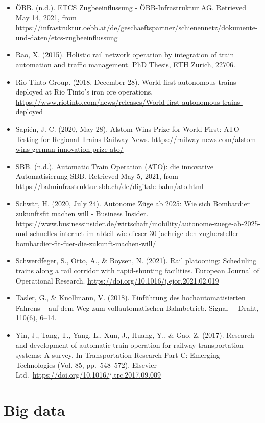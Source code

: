 \documentclass[
]{book}
\begin{document}
\begin{itemize}
\item
  ÖBB. (n.d.). ETCS Zugbeeinflussung - ÖBB-Infrastruktur AG. Retrieved May 14, 2021, from \url{https://infrastruktur.oebb.at/de/geschaeftspartner/schienennetz/dokumente-und-daten/etcs-zugbeeinflussung}
\item
  Rao, X. (2015). Holistic rail network operation by integration of train automation and traffic management. PhD Thesis, ETH Zurich, 22706.
\item
  Rio Tinto Group. (2018, December 28). World-first autonomous trains deployed at Rio Tinto's iron ore operations. \url{https://www.riotinto.com/news/releases/World-first-autonomous-trains-deployed}
\item
  Sapién, J. C. (2020, May 28). Alstom Wins Prize for World-First: ATO Testing for Regional Trains \textbar{} Railway-News. \url{https://railway-news.com/alstom-wins-german-innovation-prize-ato/}
\item
  SBB. (n.d.). Automatic Train Operation (ATO): die innovative Automatisierung \textbar{} SBB. Retrieved May 5, 2021, from \url{https://bahninfrastruktur.sbb.ch/de/digitale-bahn/ato.html}
\item
  Schwär, H. (2020, July 24). Autonome Züge ab 2025: Wie sich Bombardier zukunftsfit machen will - Business Insider. \url{https://www.businessinsider.de/wirtschaft/mobility/autonome-zuege-ab-2025-und-schnelles-internet-im-abteil-wie-dieser-30-jaehrige-den-zughersteller-bombardier-fit-fuer-die-zukunft-machen-will/}
\item
  Schwerdfeger, S., Otto, A., \& Boysen, N. (2021). Rail platooning: Scheduling trains along a rail corridor with rapid-shunting facilities. European Journal of Operational Research. \url{https://doi.org/10.1016/j.ejor.2021.02.019}
\item
  Tasler, G., \& Knollmann, V. (2018). Einführung des hochautomatisierten Fahrens -- auf dem Weg zum vollautomatischen Bahnbetrieb. Signal + Draht, 110(6), 6--14.
\item
  Yin, J., Tang, T., Yang, L., Xun, J., Huang, Y., \& Gao, Z. (2017). Research and development of automatic train operation for railway transportation systems: A survey. In Transportation Research Part C: Emerging Technologies (Vol. 85, pp.~548--572). Elsevier Ltd.~\url{https://doi.org/10.1016/j.trc.2017.09.009}
\end{itemize}

\hypertarget{big}{%
\chapter{Big data}\label{big}}
\end{document}
